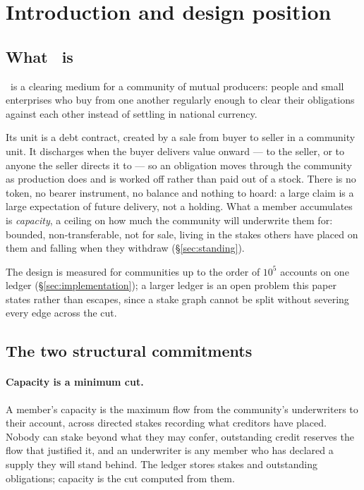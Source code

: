 \section{Introduction and design position}
\label{sec:position}

\subsection{What \edet\ is}

\edet\ is a clearing medium for a community of mutual producers: people and small
enterprises who buy from one another regularly enough to clear their obligations against
each other instead of settling in national currency.

Its unit is a debt contract, created by a sale from buyer to seller in a community unit.
It discharges when the buyer delivers value onward --- to the seller, or to anyone the
seller directs it to --- so an obligation moves through the community as production does
and is worked off rather than paid out of a stock. There is no token, no bearer
instrument, no balance and nothing to hoard: a large claim is a large expectation of
future delivery, not a holding. What a member accumulates is \emph{capacity}, a ceiling on
how much the community will underwrite them for: bounded, non-transferable, not for sale,
living in the stakes others have placed on them and falling when they withdraw
(\S\ref{sec:standing}).

The design is measured for communities up to the order of $10^5$ accounts on one ledger
(\S\ref{sec:implementation}); a larger ledger is an open problem this paper states rather
than escapes, since a stake graph cannot be split without severing every edge across the
cut.

\subsection{The two structural commitments}

\paragraph{Capacity is a minimum cut.} A member's capacity is the maximum flow from the
community's underwriters to their account, across directed stakes recording what creditors
have placed. Nobody can stake beyond what they may confer, outstanding credit reserves the
flow that justified it, and an underwriter is any member who has declared a supply they
will stand behind. The ledger stores stakes and outstanding obligations; capacity is the
cut computed from them.

